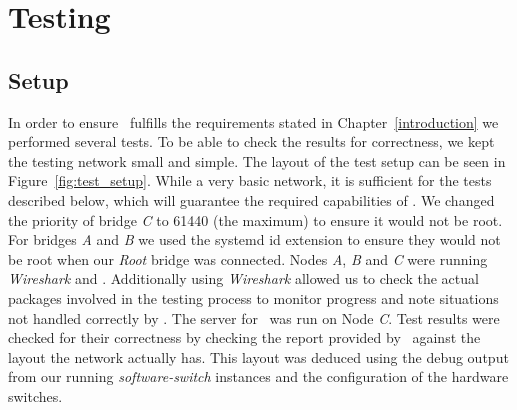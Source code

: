 \chapter{Testing}
\label{testing}
\section{Setup}
In order to ensure \tool\ fulfills the requirements stated in Chapter~\ref{introduction} we performed several tests.
To be able to check the results for correctness, we kept the testing network small and simple.
The layout of the test setup can be seen in Figure~\ref{fig:test_setup}.
While a very basic network, it is sufficient for the tests described below, which will guarantee the required capabilities of \tool.
We changed the priority of bridge \textit{C} to 61440 (the maximum) to ensure it would not be root.
For bridges \textit{A} and \textit{B} we used the systemd id extension to ensure they would not be root when our \textit{Root} bridge was connected.
Nodes \textit{A}, \textit{B} and \textit{C} were running \textit{Wireshark} and \tool.
Additionally using \textit{Wireshark} allowed us to check the actual packages involved in the testing process to monitor progress and note situations not handled correctly by \tool.
The server for \tool\ was run on Node \textit{C}.
Test results were checked for their correctness by checking the report provided by \tool\ against the layout the network actually has.
This layout was deduced using the debug output from our running \textit{software-switch} instances and the configuration of the hardware switches.

